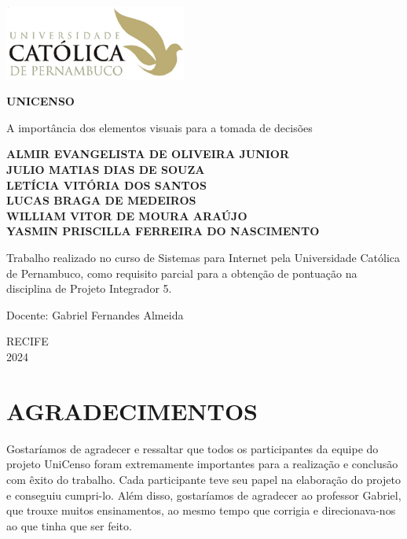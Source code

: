 \documentclass[a4paper,12pt]{article}
\begin{document}
\begin{titlepage}
  \centering
  \includegraphics[width=6cm]{logo.png} 
  
  \vspace*{2cm}

  \Huge
  \textbf{UNICENSO}

  \vspace{0.5cm}
  \LARGE
  A importância dos elementos visuais para a tomada de decisões

  \vspace{1.5cm}

  \small
  \textbf{ALMIR EVANGELISTA DE OLIVEIRA JUNIOR}\\
  \textbf{JULIO MATIAS DIAS DE SOUZA}\\
  \textbf{LETÍCIA VITÓRIA DOS SANTOS}\\
  \textbf{LUCAS BRAGA DE MEDEIROS}\\
  \textbf{WILLIAM VITOR DE MOURA ARAÚJO}\\
  \textbf{YASMIN PRISCILLA FERREIRA DO NASCIMENTO}

  \vfill

  \Large
  Trabalho realizado no curso de Sistemas para Internet pela Universidade Católica de Pernambuco, como requisito parcial para a obtenção de pontuação na disciplina de Projeto Integrador 5.

  \vspace{0.8cm}
  \Large
  Docente: Gabriel Fernandes Almeida

  \vspace{0.8cm}
  \Large
  RECIFE\\
  2024
\end{titlepage}

\newpage

\section*{AGRADECIMENTOS}

Gostaríamos de agradecer e ressaltar que todos os participantes da equipe do projeto UniCenso foram extremamente importantes para a realização e conclusão com êxito do trabalho. Cada participante teve seu papel na elaboração do projeto e conseguiu cumpri-lo. Além disso, gostaríamos de agradecer ao professor Gabriel, que trouxe muitos ensinamentos, ao mesmo tempo que corrigia e direcionava-nos ao que tinha que ser feito.
\end{document}
